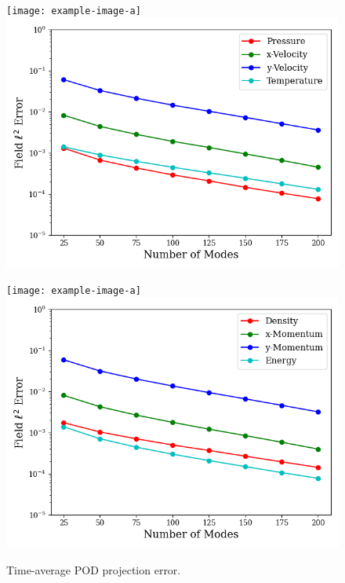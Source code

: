 \begin{figure}
	\begin{minipage}{0.48\linewidth}
		\ifdefined\DRAFT
			\texttt{[image: example-image-a]}
		\else
			\includegraphics[width=0.99\linewidth,trim={0.5em 0.5em 0.5em 0.5em},clip]{Chapters/CavityAndCVRC/Images/cavity/projection_error_primitive.png}
		\fi
	\end{minipage} \hspace{0.5em}
	\begin{minipage}{0.48\linewidth}
		\ifdefined\DRAFT
			\texttt{[image: example-image-a]}
		\else
			\includegraphics[width=0.99\linewidth,trim={0.5em 0.5em 0.5em 0.5em},clip]{Chapters/CavityAndCVRC/Images/cavity/projection_error_conservative.png}
		\fi
	\end{minipage}
	\caption{\label{fig:cavityProjErr}Time-average POD projection error.}
\end{figure}

